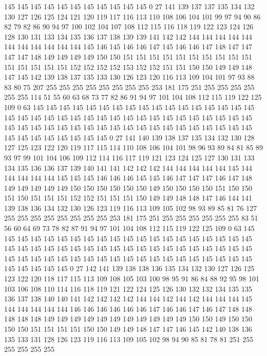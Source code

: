 145 145 145 145 145 145 145 145 145 145 145 0 27 141 139 137 137 135 134 132
130 127 126 125 124 121 120 119 117 116 113 110 108 106 104 101 99 97 94 90
86 82 79 82 86 90 94 97 100 102 104 107 108 112 115 116 118 119 122 123
124 126 128 130 131 133 134 135 136 137 138 139 139 141 142 142 144 144 144 144
144 144 144 144 144 144 144 145 146 145 146 146 147 145 146 146 147 148 147 147
147 147 148 149 149 149 149 150 150 151 151 151 151 151 151 151 151 151 151 151
151 151 151 151 152 152 152 152 153 152 152 151 151 150 150 149 149 148 147 145
142 139 138 137 135 133 130 126 123 120 116 113 109 104 101 97 93 88 83 80
75 207 255 255 255 255 255 255 255 255 253 181 175 251 255 255 255 255 255 255
114 51 55 60 63 68 73 77 82 86 91 94 97 101 104 108 112 115 119 122
125 109 0 63 145 145 145 145 145 145 145 145 145 145 145 145 145 145 145 145
145 145 145 145 145 145 145 145 145 145 145 145 145 145 145 145 145 145 145 145
145 145 145 145 145 145 145 145 145 145 145 145 145 145 145 145 145 145 145 145
145 145 145 145 145 145 145 0 27 141 140 139 138 137 135 134 132 130 128 127
125 123 122 120 119 117 115 114 110 108 106 104 101 98 96 93 89 84 81 85
89 93 97 99 101 104 106 109 112 114 116 117 119 121 123 124 125 127 130 131
133 134 135 136 136 137 139 140 141 141 142 142 142 144 144 144 144 144 145 144
144 144 144 144 145 145 145 146 146 146 145 145 146 147 147 147 146 147 148 149
149 149 149 149 150 150 150 150 150 150 149 150 150 150 150 151 150 150 151 150
151 151 151 152 152 151 151 151 150 149 149 148 148 147 146 144 141 139 138 136
134 132 130 126 123 119 116 113 109 105 102 98 93 89 85 81 76 127 255 255
255 255 255 255 255 255 253 181 175 251 255 255 255 255 255 255 83 51 56 60
64 69 73 78 82 87 91 94 97 101 104 108 112 115 119 122 125 109 0 63
145 145 145 145 145 145 145 145 145 145 145 145 145 145 145 145 145 145 145 145
145 145 145 145 145 145 145 145 145 145 145 145 145 145 145 145 145 145 145 145
145 145 145 145 145 145 145 145 145 145 145 145 145 145 145 145 145 145 145 145
145 145 145 0 27 142 141 139 138 138 136 135 134 132 130 127 126 125 123 122
120 118 117 115 113 109 108 105 103 100 98 95 91 86 84 88 92 95 98 101
103 106 108 110 114 116 118 119 121 122 124 125 126 130 132 132 134 135 135 136
137 138 140 140 141 142 142 142 142 144 144 142 144 142 144 144 144 145 144 144
144 144 144 146 146 146 146 146 146 147 146 146 147 146 147 148 148 148 148 148
149 149 149 149 149 149 149 149 149 149 149 150 150 149 150 150 150 150 151 151
151 151 150 150 149 149 148 147 147 146 145 142 140 138 136 135 133 131 128 126
123 119 116 113 109 105 102 98 94 90 85 81 78 81 251 255 255 255 255 255
